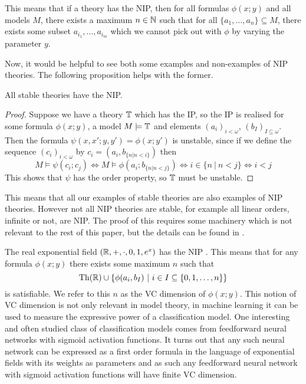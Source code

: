 This means that if a theory has the NIP, then for all formulas $\phi(x;y)$ and all models $M$,
there exists a maximum $n \in \mathbb{N}$ such that for all $\{a_1, \dots, a_n\} \subseteq M$, there exists
some subset ${a_{i_1}, \dots, a_{i_m}}$ which we cannot pick out with $\phi$ by varying the
parameter $y$.

Now, it would be helpful to see both some examples and non-examples of NIP theories. The
following proposition helps with the former.

\begin{prop}
  All stable theories have the NIP.
\end{prop}
\begin{proof}
  Suppose we have a theory $\mathbb{T}$ which has the IP, so the IP is realised for some formula
  $\phi(x;y)$, a model $M \models \mathbb{T}$ and elements $(a_i)_{i<\omega}$,
  $(b_I)_{I \subseteq \omega}$. Then the formula $\psi(x,x';y,y') = \phi(x;y')$ is unstable,
  since if we define the sequence $(c_i)_{i<\omega}$ by $c_i=(a_i,b_{\{n | n < i\}})$ then
  \begin{equation*}
    M \models \psi(c_i;c_j) \iff
      M \models \phi(a_i; b_{\{n|n < j\}}) \iff
      i \in \{n\ |\ n < j\} \iff
      i < j
  \end{equation*}
  This shows that $\psi$ has the order property, so $\mathbb{T}$ must be unstable.
\end{proof}

This means that all our examples of stable theories are also examples of NIP theories. However not
all NIP theories are stable, for example all linear orders, infinite or not, are NIP. The proof of
this requires some machinery which is not relevant to the rest of this paper, but the details
can be found in \cite{simon15}.


\begin{exmp}
  The real exponential field $(\mathbb{R},+,\cdot,0,1,e^x)$ has the NIP \cite{steinhorn1999}. This means
  that for any formula $\phi(x;y)$ there exists some maximum $n$ such that
  \begin{equation*}
    \operatorname{Th}(\mathbb{R}) \cup \{\phi(a_i,b_I)\ |\ i \in I \subseteq \{0,1,\dots,n\}\}
  \end{equation*}
  is satisfiable. We refer to this $n$ as the VC dimension of $\phi(x;y)$. This notion of VC
  dimension is not only relevant in model theory, in machine learning it can be used to measure the
  expressive power of a classification model. One interesting and often studied class of
  classification models comes from feedforward neural networks with sigmoid activation functions. It
  turns out that any such neural network can be expressed as a first order formula in the language
  of exponential fields with its weights as parameters \cite{macintyre93} and as such any
  feedforward neural network with sigmoid activation functions will have finite VC dimension.
\end{exmp}

